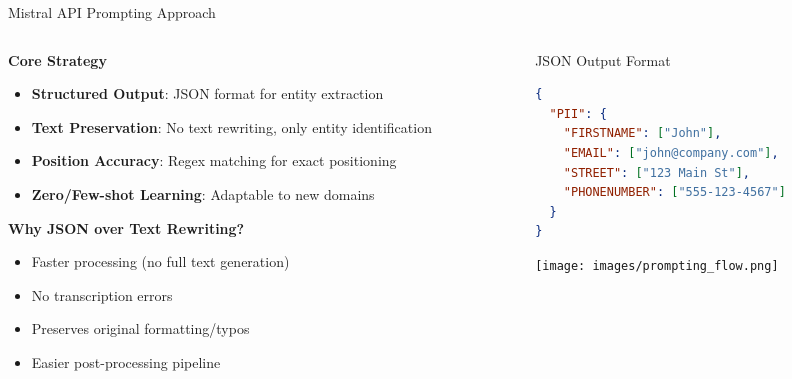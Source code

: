 \documentclass[aspectratio=169]{beamer}
\begin{document}
\begin{frame}{Mistral API Prompting Approach}
\begin{columns}
\begin{column}{0.6\textwidth}
\textbf{Core Strategy}
\begin{itemize}
\item \textbf{Structured Output}: JSON format for entity extraction
\item \textbf{Text Preservation}: No text rewriting, only entity identification
\item \textbf{Position Accuracy}: Regex matching for exact positioning
\item \textbf{Zero/Few-shot Learning}: Adaptable to new domains
\end{itemize}

\vspace{0.3cm}
\textbf{Why JSON over Text Rewriting?}
\begin{itemize}
\item Faster processing (no full text generation)
\item No transcription errors
\item Preserves original formatting/typos
\item Easier post-processing pipeline
\end{itemize}
\end{column}
\begin{column}{0.4\textwidth}
\begin{block}{JSON Output Format}
\begin{lstlisting}[language=json,basicstyle=\tiny]
{
  "PII": {
    "FIRSTNAME": ["John"],
    "EMAIL": ["john@company.com"],
    "STREET": ["123 Main St"],
    "PHONENUMBER": ["555-123-4567"]
  }
}
\end{lstlisting}
\end{block}

\vspace{0.3cm}
\begin{center}
\texttt{[image: images/prompting\_flow.png]}
\end{center}
\end{column}
\end{columns}
\end{frame}
\end{document}
